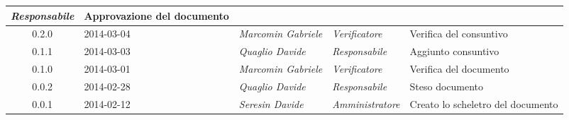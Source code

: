 \begin{small}
\begin{tabular}{|c|p{1.8cm}|p{2.8cm}|p{2.8cm}|p{3.5cm}|}
\textit{Responsabile} &  Approvazione del documento\\
\hline
0.2.0 & 2014-03-04 & 
\textit{Marcomin Gabriele} &
\textit{Verificatore} &  Verifica del consuntivo\\
\hline
0.1.1 & 2014-03-03 & 
\textit{Quaglio Davide} &
\textit{Responsabile} &  Aggiunto consuntivo\\
\hline
0.1.0 & 2014-03-01 & 
\textit{Marcomin Gabriele} &
\textit{Verificatore} &  Verifica del documento \\
\hline
0.0.2 & 2014-02-28 & 
\textit{Quaglio Davide} &
\textit{Responsabile} &  Steso documento\\
\hline
0.0.1 & 2014-02-12 & 
\textit{Seresin Davide} &
\textit{Amministratore} &  Creato lo scheletro del documento\\
\hline
\end{tabular}\\
\end{small}